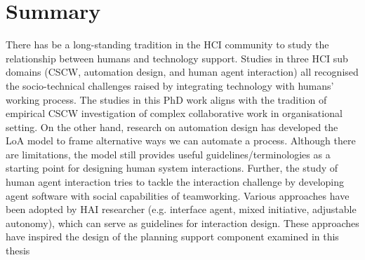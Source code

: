 

\section{Summary}


There has be a long-standing tradition in the \ac{HCI} community to study the relationship between humans and technology support. Studies in three \ac{HCI} sub domains (\ac{CSCW}, automation design, and human agent interaction) all recognised the socio-technical challenges raised by integrating technology with humans' working process. The studies in this PhD work aligns with the tradition of empirical \ac{CSCW}  investigation of complex collaborative work in organisational setting. On the other hand, research on automation design has developed the \ac{LoA} model to frame alternative ways we can automate a process. Although there are limitations, the model still provides useful guidelines/terminologies as a starting point for designing human system interactions. Further, the study of human agent interaction tries to tackle the interaction challenge by developing agent software with social capabilities of teamworking. Various approaches have been adopted by \ac{HAI} researcher (e.g. interface agent, mixed initiative, adjustable autonomy), which can serve as guidelines for interaction design. These approaches have inspired the design of the planning support component examined in this thesis\\

